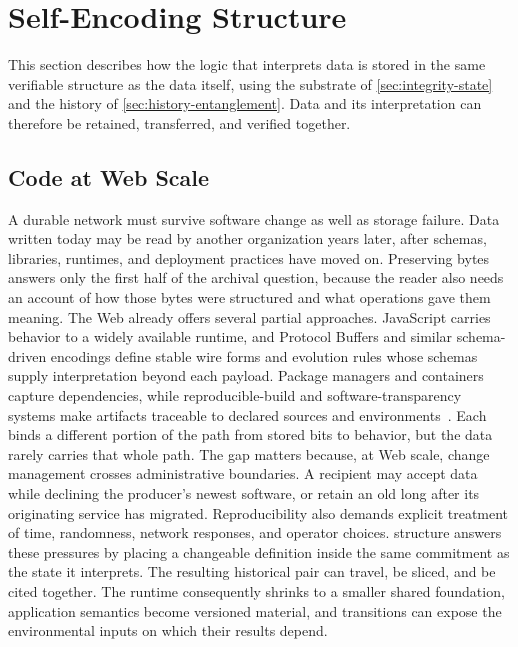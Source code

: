 \section{Self-Encoding Structure}
\label{sec:self-encoding}

This section describes how the logic that interprets data is stored in the same verifiable structure as the data itself, using the substrate of \cref{sec:integrity-state} and the history of \cref{sec:history-entanglement}. Data and its interpretation can therefore be retained, transferred, and verified together.

\subsection{Code at Web Scale}

A durable network must survive software change as well as storage failure. Data written today may be read by another organization years later, after schemas, libraries, runtimes, and deployment practices have moved on. Preserving bytes answers only the first half of the archival question, because the reader also needs an account of how those bytes were structured and what operations gave them meaning. The Web already offers several partial approaches. JavaScript carries behavior to a widely available runtime, and Protocol Buffers and similar schema-driven encodings define stable wire forms and evolution rules whose schemas supply interpretation beyond each payload. Package managers and containers capture dependencies, while reproducible-build and software-transparency systems make artifacts traceable to declared sources and environments~\cite{Nikitin2017chainiac}. Each binds a different portion of the path from stored bits to behavior, but the data rarely carries that whole path. The gap matters because, at Web scale, change management crosses administrative boundaries. A recipient may accept data while declining the producer's newest software, or retain an old  long after its originating service has migrated. Reproducibility also demands explicit treatment of time, randomness, network responses, and operator choices.  structure answers these pressures by placing a changeable definition inside the same commitment as the state it interprets. The resulting historical pair can travel, be sliced, and be cited together. The runtime consequently shrinks to a smaller shared foundation, application semantics become versioned material, and transitions can expose the environmental inputs on which their results depend.

